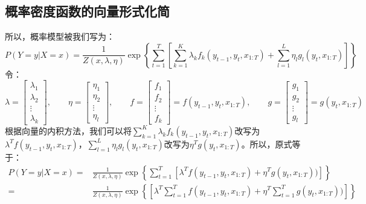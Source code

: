 \documentclass[a4paper]{article}
\begin{document}
\subsection{概率密度函数的向量形式化简}
所以，概率模型被我们写为：
\begin{equation}
    P(Y=y|X=x) = \frac{1}{Z(x,\lambda,\eta)} \exp \left\{ \sum_{t=1}^T \left[ \sum_{k=1}^K \lambda_k f_k(y_{t-1},y_t,x_{1:T}) + \sum_{l=1}^L \eta_l g_l(y_t,x_{1:T}) \right] \right\}
\end{equation}
令：
\begin{equation}
    \lambda =
    \begin{bmatrix}
    \lambda_1 \\
    \lambda_2 \\
    \vdots \\
    \lambda_k
    \end{bmatrix}, \qquad
    \eta =
    \begin{bmatrix}
    \eta_1 \\
    \eta_2 \\
    \vdots \\
    \eta_l
    \end{bmatrix}, \qquad
    f = 
    \begin{bmatrix}
    f_1 \\
    f_2 \\
    \vdots \\
    f_k
    \end{bmatrix} = f(y_{t-1},y_t,x_{1:T}), \qquad
    g = 
    \begin{bmatrix}
    g_1 \\
    g_2 \\
    \vdots \\
    g_l
    \end{bmatrix} = g(y_t,x_{1:T})
\end{equation}
根据向量的内积方法，我们可以将$\sum_{k=1}^K \lambda_k f_k(y_{t-1},y_t,x_{1:T})$改写为$\lambda^T f(y_{t-1},y_t,x_{1:T})$，$\sum_{l=1}^L \eta_l g_l(y_t,x_{1:T})$改写为$\eta^T g(y_t,x_{1:T})$。所以，原式等于：
\begin{equation}
\begin{split}
    P(Y=y|X=x) = & \frac{1}{Z(x,\lambda,\eta)} \exp \left\{ \sum_{t=1}^T \left[ \lambda^T f(y_{t-1},y_t,x_{1:T}) + \eta^T g(y_t,x_{1:T})) \right] \right\} \\
    = & \frac{1}{Z(x,\lambda,\eta)} \exp \left\{ \left[  \lambda^T \sum_{t=1}^T f(y_{t-1},y_t,x_{1:T}) +  \eta^T\sum_{t=1}^T g(y_t,x_{1:T})) \right] \right\}
\end{split}
\end{equation}
\end{document}
